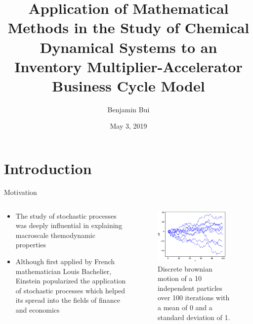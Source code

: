 \documentclass{beamer}
\title{Application of Mathematical Methods in the Study of Chemical Dynamical Systems to an Inventory Multiplier-Accelerator Business Cycle Model}
\author{Benjamin Bui}
\date{May 3, 2019}
\begin{document}
\begin{frame}
	\titlepage
\end{frame}

\section{Introduction}
\begin{frame}{Motivation}
	\begin{columns}
	\begin{column}{0.5\textwidth}
	\begin{itemize}
		\item The study of stochastic processes was deeply influential in explaining macroscale themodynamic properties

		\item Although first applied by French mathematician Louis Bachelier\autocite{Bachelier1900}, Einstein popularized the application of stochastic processes which helped its spread into the fields of finance and economics
	\end{itemize}
	\end{column}
	\begin{column}{0.5\textwidth}
		\begin{figure}
			\centering
			\includegraphics[width=0.9\textwidth]{brownian_motion.eps}
			\caption{Discrete brownian motion of a 10 independent particles over 100 iterations with a mean of 0 and a standard deviation of 1.}
		\end{figure}
	\end{column}
	\end{columns}
\end{frame}
\end{document}
